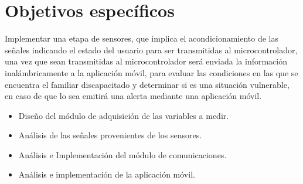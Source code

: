 \section{Objetivos específicos}

Implementar una etapa de sensores, que implica el acondicionamiento de las señales indicando el estado del usuario para ser transmitidas al microcontrolador, una vez que sean transmitidas al microcontrolador será enviada la información inalámbricamente a la aplicación móvil, para evaluar las condiciones en las que se encuentra el familiar discapacitado y determinar si es una situación vulnerable, en caso de que lo sea emitirá una alerta mediante una aplicación móvil. 

\begin{itemize}
	\item Diseño del módulo de adquisición de las variables a medir.
	\item Análisis de las señales provenientes de los sensores.
	\item Análisis e Implementación del módulo de comunicaciones.
	\item Análisis e implementación de la aplicación móvil.
\end{itemize}

  
